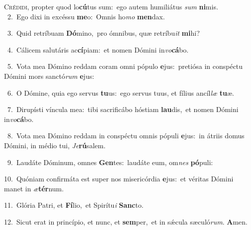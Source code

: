 \lettrine{\initial\textcolor{\initialcolor}{C}}{rédidi,} propter quod lo\-\textbf{cú}\-tus sum:~\star ego autem humiliátus \textit{sum} \textbf{ni}\-mis.\\
{\numbfont\textcolor{\numbcolor}{~2.}}~Ego dixi in excéssu \textbf{me}\-o:~\star Omnis ho\textit{mo} \textbf{men}\-dax.\par
{\numbfont\textcolor{\numbcolor}{~3.}}~Quid retríbuam \textbf{Dó}\-mino,~\star pro ómnibus, quæ retríbu\textit{it} \textbf{mi}\-hi?\par
{\numbfont\textcolor{\numbcolor}{~4.}}~Cálicem salutáris ac\-\textbf{cí}\-piam:~\star et nomen Dómini in\-\textit{vo}\-\textbf{cá}bo.\par
{\numbfont\textcolor{\numbcolor}{~5.}}~Vota mea Dómino reddam coram omni pópulo \textbf{e}\-jus:~\star pretiósa in conspéctu Dómini mors sanctó\textit{rum} \textbf{e}\-jus:\par
{\numbfont\textcolor{\numbcolor}{~6.}}~O Dómine, quia ego servus \textbf{tu}\-us:~\star ego servus tuus, et fílius ancíl\textit{læ} \textbf{tu}\-æ.\par
{\numbfont\textcolor{\numbcolor}{~7.}}~Dirupísti víncula mea:~\dagger tibi sacrificábo hóstiam \textbf{lau}\-dis,~\star et nomen Dómini in\-\textit{vo}\-\textbf{cá}bo.\par
{\numbfont\textcolor{\numbcolor}{~8.}}~Vota mea Dómino reddam in conspéctu omnis pópuli \textbf{e}\-jus:~\star in átriis domus Dómini, in médio tui, \textit{Je}\-\textbf{rú}salem.\par
{\numbfont\textcolor{\numbcolor}{~9.}}~Laudáte Dóminum, omnes \textbf{Gen}\-tes:~\star laudáte eum, om\textit{nes} \textbf{pó}\-puli:\par
{\numbfont\textcolor{\numbcolor}{10.}}~Quóniam confirmáta est super nos misericórdia \textbf{e}\-jus:~\star et véritas Dómini manet in \textit{æ}\-\textbf{tér}num.\par
{\numbfont\textcolor{\numbcolor}{11.}}~Glória Patri, et \textbf{Fí}\-lio,~\star et Spirítu\textit{i} \textbf{Sanc}\-to.\par
{\numbfont\textcolor{\numbcolor}{12.}}~Sicut erat in princípio, et nunc, et \textbf{sem}\-per,~\star et in sǽcula sæculó\-\textit{rum}\-. \textbf{A}\-men.\par
